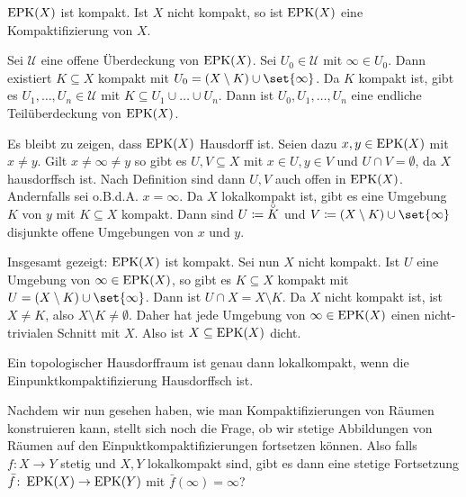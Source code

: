 \begin{proposition}[{name=[Eigenschaften der Einpunktkompaktifizierung]}]
	$\operatorname{EPK}(X)$ ist kompakt. Ist $X$ nicht kompakt, so ist $\operatorname{EPK}(X)$ eine Kompaktifizierung von $X$.
\end{proposition}
\begin{beweis}
	Sei $\mathcal{U}$ eine offene Überdeckung von $\operatorname{EPK}(X)$. 
	Sei $U_0 \in \mathcal{U}$ mit $\infty \in U_0$. 
	Dann existiert $K \subseteq X$ kompakt mit $U_0 = (X \setminus K) \cup \set{\infty}$. 
	Da $K$ kompakt ist, gibt es $U_1, \ldots , U_n \in \mathcal{U}$ mit $K \subseteq U_1 \cup \ldots \cup U_n$. 
	Dann ist $U_0, U_1, \ldots , U_n$ eine endliche Teilüberdeckung von $\operatorname{EPK}(X)$.

	Es bleibt zu zeigen, dass $\operatorname{EPK}(X)$ Hausdorff ist. 
	Seien dazu $x,y \in \operatorname{EPK}(X)$ mit $x \neq y$. 
	Gilt $x \neq \infty \neq y$ so gibt es $U,V \subseteq X$ mit $x \in U,  y \in V$ und $U\cap V = \emptyset$, da $X$ hausdorffsch ist. 
	Nach Definition sind dann $U,V$ auch offen in $\operatorname{EPK}(X)$. 
	Andernfalls sei o.B.d.A. $x = \infty$. 
	Da $X$ lokalkompakt ist, gibt es eine Umgebung $K$ von $y$ mit $K \subseteq X$ kompakt. 
	Dann sind $U \coloneqq \interior{K}$ und $V \coloneqq (X \setminus K) \cup \set{\infty}$ disjunkte offene Umgebungen von 
	$x$ und $y$.

	Insgesamt gezeigt: $\operatorname{EPK}(X)$ ist kompakt. Sei nun $X$ nicht kompakt. 
	Ist $U$ eine Umgebung von $\infty \in \operatorname{EPK}(X)$, so gibt es $K \subseteq X$ kompakt mit 
	$U = (X \setminus K) \cup \set{\infty}$. Dann ist $U \cap X = X \setminus K$. 
	Da $X$ nicht kompakt ist, ist $X \neq K$, also $X \setminus K  \neq \emptyset$. 
	Daher hat jede Umgebung von $\infty \in \operatorname{EPK}(X)$ einen nicht-trivialen Schnitt mit $X$. 
	Also ist $X \subseteq \operatorname{EPK}(X)$ dicht.
\end{beweis}

\begin{korollarB}[{name=[Einpunktkompaktifizierung hausdorff]}]
	Ein topologischer Hausdorffraum ist genau dann lokalkompakt, wenn die Einpunktkompaktifizierung Hausdorffsch ist.
\end{korollarB}

Nachdem wir nun gesehen haben, wie man Kompaktifizierungen von Räumen konstruieren kann, stellt sich noch die Frage, ob wir stetige Abbildungen von Räumen auf den Einpuktkompaktifizierungen fortsetzen können.
Also falls $f \colon X \to Y$ stetig und $X,Y$ lokalkompakt sind, gibt es dann eine stetige Fortsetzung $\bar{f} \colon \operatorname{EPK}(X) \to \operatorname{EPK}(Y)$ mit $\bar{f}(\infty) = \infty$?


